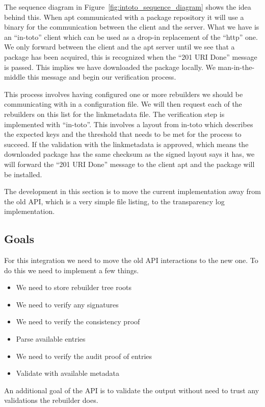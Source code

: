 \documentclass[../Main/thesis.tex]{subfiles}
\begin{document}
The sequence diagram in Figure~\ref{fig:intoto_sequence_diagram} shows the idea
behind this. When apt communicated with a package repository it will use a
binary for the communication between the client and the server. What we have is
an ``in-toto'' client which can be used as a drop-in replacement of the ``http''
one. We only forward between the client and the apt server until we see that a
package has been acquired, this is recognized when the ``201 URI Done'' message
is passed. This implies we have downloaded the package locally. We
man-in-the-middle this message and begin our verification process.

This process involves having configured one or more rebuilders we should be
communicating with in a configuration file. We will then request each of the
rebuilders on this list for the linkmetadata file. The verification step is
implemented with ``in-toto''. This involves a layout from in-toto which
describes the expected keys and the threshold that needs to be met for the
process to succeed. If the validation with the linkmetadata is approved, which
means the downloaded package has the same checksum as the signed layout says it
has, we will forward the ``201 URI Done'' message to the client apt and the
package will be installed.

The development in this section is to move the current implementation away from
the old API, which is a very simple file listing, to the transparency log
implementation.


\subsection*{Goals}%
\label{sub:apt_transport_goals}
For this integration we need to move the old API interactions to the new one. To
do this we need to implement a few things.

\begin{itemize}
    \item We need to store rebuilder tree roots
    \item We need to verify any signatures
    \item We need to verify the consistency proof
    \item Parse available entries
    \item We need to verify the audit proof of entries
    \item Validate with available metadata
\end{itemize}

An additional goal of the API is to validate the output without need to trust
any validations the rebuilder does.
\end{document}
